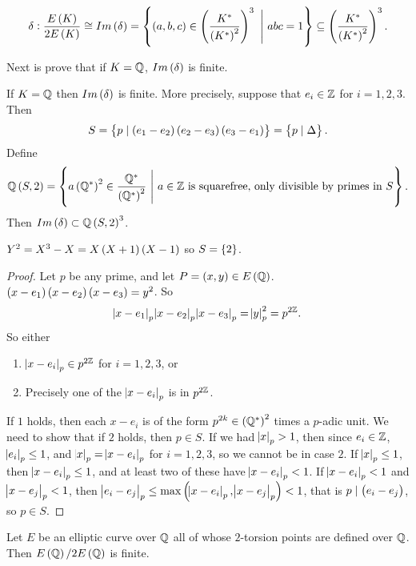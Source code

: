 \pagebreak

$$ \delta : \dfrac{E\br{K}}{2E\br{K}} \cong Im\br{\delta} = \cbr{\br{a, b, c} \in \br{\dfrac{K^*}{\br{K^*}^2}}^3 \ \Bigg| \ abc = 1} \subseteq \br{\dfrac{K^*}{\br{K^*}^2}}^3. $$

Next is prove that if $ K = \mathbb{Q} $, $ Im\br{\delta} $ is finite.


\begin{proposition}
\label{prop:8.5}
If $ K = \mathbb{Q} $ then $ Im\br{\delta} $ is finite. More precisely, suppose that $ e_i \in \mathbb{Z} $ for $ i = 1, 2, 3 $. Then
$$ S = \cbr{p \mid \br{e_1 - e_2}\br{e_2 - e_3}\br{e_3 - e_1}} = \cbr{p \mid \Delta}. $$
Define
$$ \Q\br{S, 2} = \cbr{a\br{\Q^*}^2 \in \dfrac{\Q^*}{\br{\Q^*}^2} \ \Bigg| \ a \in \Z \ \text{is squarefree, only divisible by primes in} \ S}. $$
Then $ Im\br{\delta} \subset \Q\br{S, 2}^3 $.
\end{proposition}

\begin{example*}
$ Y^2 = X^3 - X = X\br{X + 1}\br{X - 1} $ so $ S = \cbr{2} $.
\end{example*}

\begin{proof}
Let $ p $ be any prime, and let $ P = \br{x, y} \in E\br{\Q} $. $ \br{x - e_1}\br{x - e_2}\br{x - e_3} = y^2 $. So
$$ \abs{x - e_1}_p\abs{x - e_2}_p\abs{x - e_3}_p = \abs{y}_p^2 = p^{2\mathbb{Z}}. $$
So either
\begin{enumerate}
\item $ \abs{x - e_i}_p \in p^{2\mathbb{Z}} $ for $ i = 1, 2, 3 $, or
\item Precisely one of the $ \abs{x - e_i}_p $ is in $ p^{2\mathbb{Z}} $.
\end{enumerate}
If $ 1 $ holds, then each $ x - e_i $ is of the form $ p^{2k} \in \br{\Q^*}^2 $ times a $ p $-adic unit. We need to show that if $ 2 $ holds, then $ p \in S $. If we had $ \abs{x}_p > 1 $, then since $ e_i \in \mathbb{Z} $, $ \abs{e_i}_p \le 1 $, and $ \abs{x}_p = \abs{x - e_i}_p $ for $ i = 1, 2, 3 $, so we cannot be in case $ 2 $. If $ \abs{x}_p \le 1 $, then $ \abs{x - e_i}_p \le 1 $, and at least two of these have $ \abs{x - e_i}_p < 1 $. If $ \abs{x - e_i}_p < 1 $ and $ \abs{x - e_j}_p < 1 $, then $ \abs{e_i - e_j}_p \le \max\br{\abs{x - e_i}_p, \abs{x - e_j}_p} < 1 $, that is $ p \mid \br{e_i - e_j} $, so $ p \in S $.
\end{proof}

\begin{theorem}
Let $ E $ be an elliptic curve over $ \mathbb{Q} $ all of whose $ 2 $-torsion points are defined over $ \mathbb{Q} $. Then $ E\br{\Q} / 2E\br{\Q} $ is finite.
\end{theorem}

